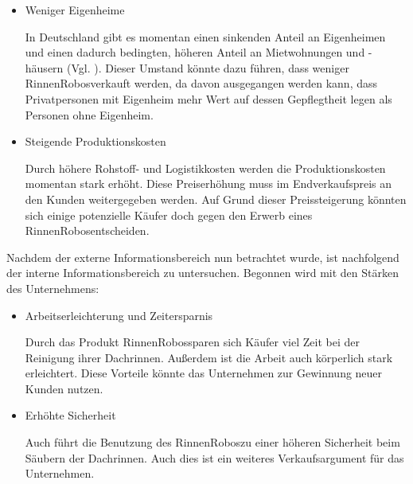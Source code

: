             \begin{itemize}
                \item Weniger Eigenheime
        
                    In Deutschland gibt es momentan einen sinkenden Anteil an Eigenheimen und einen dadurch bedingten, höheren
                    Anteil an Mietwohnungen und -häusern (Vgl. \cite{Mueller2021}). Dieser Umstand könnte dazu führen, dass
                    weniger \as RinnenRobos\adl verkauft werden, da davon ausgegangen werden kann, dass Privatpersonen mit 
                    Eigenheim mehr Wert auf dessen Gepflegtheit legen als Personen ohne Eigenheim.
        
                \item Steigende Produktionskosten
                
                    Durch höhere Rohstoff- und Logistikkosten werden die Produktionskosten momentan stark erhöht. Diese
                    Preiserhöhung muss im Endverkaufspreis an den Kunden weitergegeben werden. Auf Grund dieser Preissteigerung
                    könnten sich einige potenzielle Käufer doch gegen den Erwerb eines \as RinnenRobos\adl entscheiden.
            \end{itemize}
        
        \noindent Nachdem der externe Informationsbereich nun betrachtet wurde, ist nachfolgend der interne Informationsbereich
        zu untersuchen. Begonnen wird mit den Stärken des Unternehmens:
        
            \begin{itemize}
                \item Arbeitserleichterung und Zeitersparnis
                
                    Durch das Produkt \as RinnenRobos\adl sparen sich Käufer viel Zeit bei der Reinigung ihrer Dachrinnen.
                    Außerdem ist die Arbeit auch körperlich stark erleichtert. Diese Vorteile könnte das Unternehmen zur
                    Gewinnung neuer Kunden nutzen.
        
                \item Erhöhte Sicherheit
                
                    Auch führt die Benutzung des \as RinnenRobos\adl zu einer höheren Sicherheit beim Säubern der Dachrinnen.
                    Auch dies ist ein weiteres Verkaufsargument für das Unternehmen.
            \end{itemize}
        
